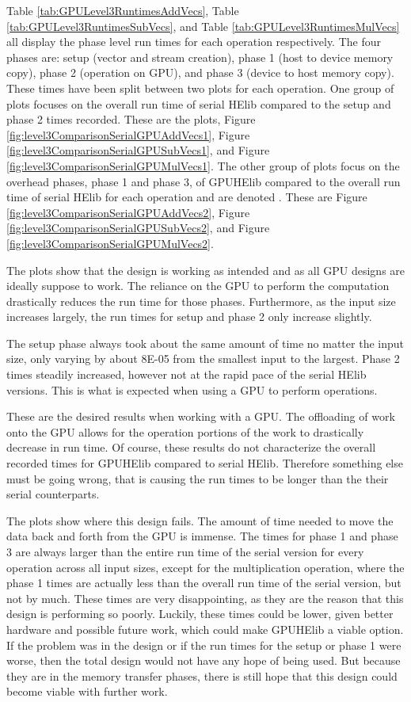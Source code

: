 Table \ref{tab:GPULevel3RuntimesAddVecs}, Table \ref{tab:GPULevel3RuntimesSubVecs}, and Table \ref{tab:GPULevel3RuntimesMulVecs} all display the phase level run times for each operation respectively. The four phases are: setup (vector and stream creation), phase 1 (host to device memory copy), phase 2 (operation on GPU), and phase 3 (device to host memory copy). These times have been split between two plots for each operation. One group of plots focuses on the overall run time of serial HElib compared to the setup and phase 2 times recorded. These are the  plots, Figure \ref{fig:level3ComparisonSerialGPUAddVecs1}, Figure \ref{fig:level3ComparisonSerialGPUSubVecs1}, and Figure \ref{fig:level3ComparisonSerialGPUMulVecs1}. The other group of plots focus on the overhead phases, phase 1 and phase 3, of GPUHElib compared to the overall run time of serial HElib for each operation and are denoted . These are Figure \ref{fig:level3ComparisonSerialGPUAddVecs2}, Figure \ref{fig:level3ComparisonSerialGPUSubVecs2}, and Figure \ref{fig:level3ComparisonSerialGPUMulVecs2}.

The  plots show that the design is working as intended and as all GPU designs are ideally suppose to work. The reliance on the GPU to perform the computation drastically reduces the run time for those phases. Furthermore, as the input size increases largely, the run times for setup and phase 2 only increase slightly. 

The setup phase always took about the same amount of time no matter the input size, only varying by about 8E-05 from the smallest input to the largest. Phase 2 times steadily increased, however not at the rapid pace of the serial HElib versions. This is what is expected when using a GPU to perform operations.

These are the desired results when working with a GPU. The offloading of work onto the GPU allows for the operation portions of the work to drastically decrease in run time. Of course, these results do not characterize the overall recorded times for GPUHElib compared to serial HElib. Therefore something else must be going wrong, that is causing the run times to be longer than the their serial counterparts.

The  plots show where this design fails. The amount of time needed to move the data back and forth from the GPU is immense. The times for phase 1 and phase 3 are always larger than the entire run time of the serial version for every operation across all input sizes, except for the multiplication operation, where the phase 1 times are actually less than the overall run time of the serial version, but not by much. These times are very disappointing, as they are the reason that this design is performing so poorly. Luckily, these times could be lower, given better hardware and possible future work, which could make GPUHElib a viable option. If the problem was in the design or if the run times for the setup or phase 1 were worse, then the total design would not have any hope of being used. But because they are in the memory transfer phases, there is still hope that this design could become viable with further work.

